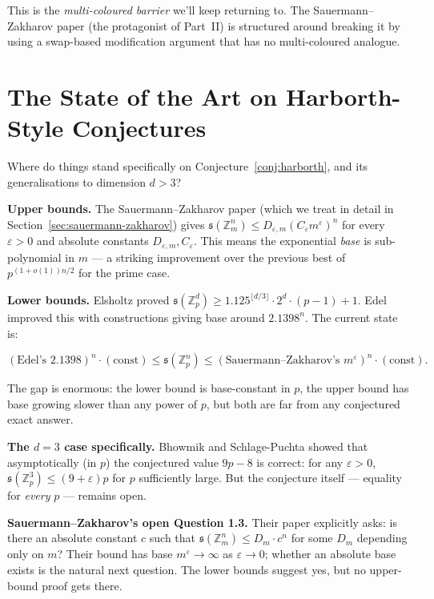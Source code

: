 \documentclass[11pt,a4paper]{article}
\theoremstyle{plain}
\theoremstyle{definition}
\theoremstyle{remark}
\newcommand{\Z}{\mathbb{Z}}
\newcommand{\sUFp}{\mathfrak{s}}
\begin{document}
This is the \emph{multi-coloured barrier} we'll keep returning to. The Sauermann--Zakharov paper (the protagonist of Part~II) is structured around breaking it by using a swap-based modification argument that has no multi-coloured analogue.

\section{The State of the Art on Harborth-Style Conjectures}

Where do things stand specifically on Conjecture~\ref{conj:harborth}, and its generalisations to dimension $d > 3$?

\textbf{Upper bounds.} The Sauermann--Zakharov paper (which we treat in detail in Section~\ref{sec:sauermann-zakharov}) gives $\sUFp(\Z_m^n) \leq D_{\varepsilon, m} (C_\varepsilon m^\varepsilon)^n$ for every $\varepsilon > 0$ and absolute constants $D_{\varepsilon, m}, C_\varepsilon$. This means the exponential \emph{base} is sub-polynomial in $m$ --- a striking improvement over the previous best of $p^{(1+o(1))n/2}$ for the prime case.

\textbf{Lower bounds.} Elsholtz proved $\sUFp(\Z_p^d) \geq 1.125^{\lfloor d/3 \rfloor} \cdot 2^d \cdot (p - 1) + 1$. Edel improved this with constructions giving base around $2.1398^n$. The current state is:

\begin{equation}
(\text{Edel's } 2.1398)^n \cdot (\text{const}) \leq \sUFp(\Z_p^n) \leq (\text{Sauermann--Zakharov's } m^\varepsilon)^n \cdot (\text{const}).
\end{equation}

The gap is enormous: the lower bound is base-constant in $p$, the upper bound has base growing slower than any power of $p$, but both are far from any conjectured exact answer.

\textbf{The $d = 3$ case specifically.} Bhowmik and Schlage-Puchta showed that asymptotically (in $p$) the conjectured value $9p - 8$ is correct: for any $\varepsilon > 0$, $\sUFp(\Z_p^3) \leq (9 + \varepsilon)p$ for $p$ sufficiently large. But the conjecture itself --- equality for \emph{every} $p$ --- remains open.

\textbf{Sauermann--Zakharov's open Question 1.3.} Their paper explicitly asks: is there an absolute constant $c$ such that $\sUFp(\Z_m^n) \leq D_m \cdot c^n$ for some $D_m$ depending only on $m$? Their bound has base $m^\varepsilon \to \infty$ as $\varepsilon \to 0$; whether an absolute base exists is the natural next question. The lower bounds suggest yes, but no upper-bound proof gets there.
\end{document}
